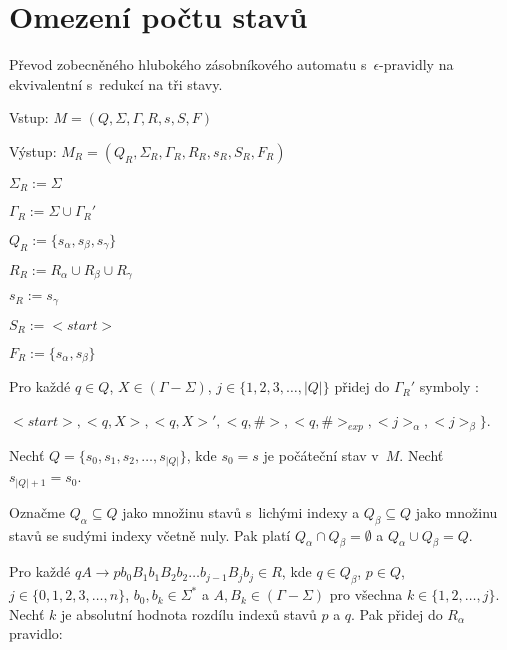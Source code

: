 \section{Omezení počtu stavů}


\begin{Alg}
Převod zobecněného hlubokého zásobníkového automatu s~$\epsilon$-pravidly na ekvivalentní s~redukcí na tři stavy.

\begin{list}{}{\setlength\parsep{0cm} \setlength\itemsep{0cm} \setlength\leftmargin{1em}}
   \item Vstup: $M = (Q,\Sigma,\Gamma, R, s, S, F)$ 
   \item Výstup: $M_{R} = (Q_{R}, \Sigma_{R}, {\Gamma}_{R}, R_{R}, s_{R},  S_{R}, F_{R})$ \medskip
    
   \item ${\Sigma}_{R} := \Sigma$
   \item ${\Gamma}_{R} := \Sigma \cup {\Gamma}_{R}'$
   \item $Q_{R} := \{s_\alpha, s_\beta, s_\gamma \}$
   \item $R_{R} := R_{\alpha} \cup R_{\beta} \cup R_{\gamma}$
   \item $s_{R} := s_{\gamma} $
   \item $S_{R} := <start> $
   \item $F_{R} := \{s_{\alpha}, s_{\beta}\} $ \medskip

   \item Pro každé $q \in Q$, $X \in (\Gamma - \Sigma)$, $j \in \{1,2,3,\dots,|Q|\}$ přidej do ${\Gamma}_{R}'$ symboly :
   \item $<start>, <q, X>, <q, X>', <q, \#>, <q, \#>_{exp}, <j>_\alpha, <j>_\beta \}$.\medskip

   \item Nechť $Q = \{s_0, s_1, s_2, \dots,s_{|Q|}\}$, kde $s_0 = s$ je počáteční stav v~$M$. Nechť $s_{|Q|+1} = s_0$.
   \item Označme $Q_\alpha \subseteq Q$ jako množinu stavů s~lichými indexy a $Q_\beta \subseteq Q$ jako množinu stavů se sudými indexy včetně nuly.
         Pak platí $Q_\alpha \cap Q_\beta = \emptyset$ a  $Q_\alpha \cup Q_\beta = Q$.\medskip

   \item Pro každé $qA \rightarrow p b_0 B_1 b_1 B_2 b_2 \dots b_{j-1} B_{j} b_j \in R$, kde $q \in Q_\beta$, $p \in Q$, $j \in \{0,1,2,3,\dots,n\}$, $b_0,b_k \in {\Sigma}^*$ a $A, B_k \in (\Gamma - \Sigma)$ pro všechna $k \in \{1,2,\dots,j\}$. 
         Nechť $k$ je absolutní hodnota rozdílu indexů stavů $p$ a $q$. 
         Pak přidej do $R_\alpha$ pravidlo:



\end{list}
\end{Alg}
